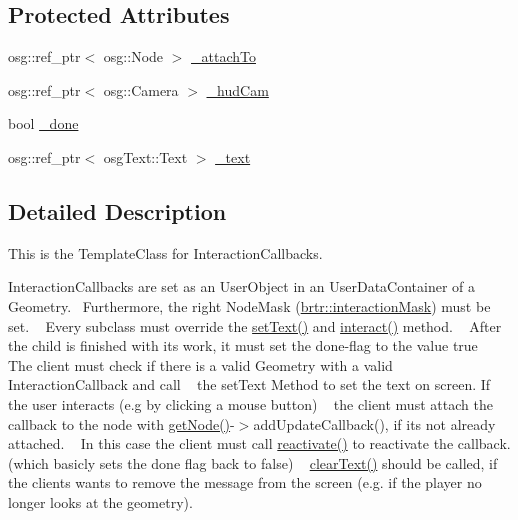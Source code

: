 \subsection*{Protected Attributes}
\begin{DoxyCompactItemize}
\item 
osg\+::ref\+\_\+ptr$<$ osg\+::\+Node $>$ \hyperlink{classbrtr_1_1_base_interaction_callback_a6666bae9f8f89ebbf75637c922ebfb54}{\+\_\+attach\+To}
\item 
osg\+::ref\+\_\+ptr$<$ osg\+::\+Camera $>$ \hyperlink{classbrtr_1_1_base_interaction_callback_a0bca3b64724235e08740be94fe4acc8d}{\+\_\+hud\+Cam}
\item 
bool \hyperlink{classbrtr_1_1_base_interaction_callback_a2f36052886ec60a227e0734bfbc4bdbb}{\+\_\+done}
\item 
osg\+::ref\+\_\+ptr$<$ osg\+Text\+::\+Text $>$ \hyperlink{classbrtr_1_1_base_interaction_callback_af60dece4300b09fafe3c048397122cbd}{\+\_\+text}
\end{DoxyCompactItemize}


\subsection{Detailed Description}
This is the Template\+Class for Interaction\+Callbacks. 

Interaction\+Callbacks are set as an User\+Object in an User\+Data\+Container of a Geometry.~\newline
 Furthermore, the right Node\+Mask (\hyperlink{namespacebrtr_a2060f4d70c0e3bc7e2e35f82e279a40d}{brtr\+::interaction\+Mask}) must be set. ~\newline
 Every subclass must override the \hyperlink{classbrtr_1_1_base_interaction_callback_a0fe57e329f044e21d49041c861435ad8}{set\+Text()} and \hyperlink{classbrtr_1_1_base_interaction_callback_a3ed50c9c1725f932e0b78c90ba24e1ed}{interact()} method. ~\newline
 After the child is finished with its work, it must set the done-\/flag to the value true ~\newline
 The client must check if there is a valid Geometry with a valid Interaction\+Callback and call ~\newline
 the set\+Text Method to set the text on screen. If the user interacts (e.\+g by clicking a mouse button) ~\newline
 the client must attach the callback to the node with \hyperlink{classbrtr_1_1_base_interaction_callback_aafca24ccde1cf21f4132f65a83e0b2bc}{get\+Node()}-\/$>$add\+Update\+Callback(), if its not already attached. ~\newline
 In this case the client must call \hyperlink{classbrtr_1_1_base_interaction_callback_a95ede7c8aa0dc1e067ae64615ecb23db}{reactivate()} to reactivate the callback. (which basicly sets the done flag back to false) ~\newline
 \hyperlink{classbrtr_1_1_base_interaction_callback_ad74fe9ac5d86c7f23d18614d5abb1003}{clear\+Text()} should be called, if the clients wants to remove the message from the screen (e.\+g. if the player no longer looks at the geometry).

